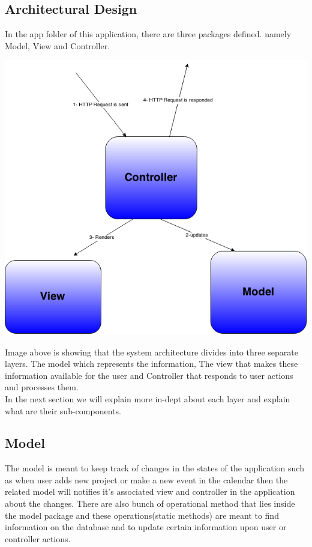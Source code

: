 \subsection{Architectural Design} %
\label{sub:arichtectural_design}
%

In the app folder of this application, there are three packages defined. namely Model, View and Controller. 
\begin{center}
\includegraphics[scale=0.3]{./img/dsgn_img/MVCdiag.png}
	
\end{center}

Image above is showing that the system architecture divides into three separate layers. The model which represents the information, The view that makes these information available for the user and Controller that responds to user actions and processes them. \\
In the next section we will explain more in-dept about each layer and explain what are their sub-components. 

\subsection{Model} %
\label{sub:design_rationale}
The model is meant to keep track of changes in the states of the application such as when user adds new project or make a new event in the calendar then the related model will notifies it's associated view and controller in the application about the changes. There are also bunch of operational method that lies inside the model package and these operations(static methods) are meant to find information on the database and to update certain information upon user or controller actions.

